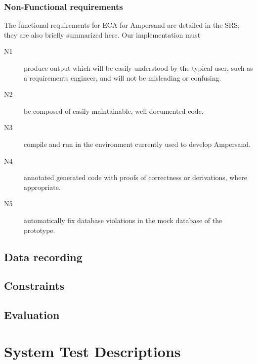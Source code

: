 \documentclass[12pt]{report}
\begin{document}
\subsection{Non-Functional requirements}
The functional requirements for ECA for Ampersand are detailed in the SRS; they
are also briefly summarized here. Our implementation must

\begin{description}
\item[N1] produce output which will be easily understood by the typical user,
  such as a requirements engineer, and will not be misleading or confusing.  
\item[N2] be composed of easily maintainable, well documented code.
\item[N3] compile and run in the environment currently used to develop
  Ampersand.
\item[N4] annotated generated code with proofs of correctness or derivations,
  where appropriate. 
\item[N5] automatically fix database violations in the mock database of the
  prototype. 
\end{description}

\section{Data recording}
\section{Constraints}
\section{Evaluation}


\chapter{System Test Descriptions}



\end{document}
